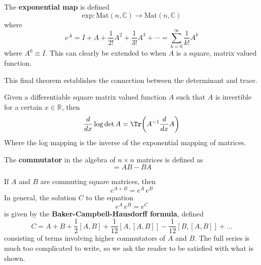  \begin{definition}
    The \textbf{exponential map} is defined
    \begin{equation}
      \text{exp}: \text{Mat}(n, \mathbb{C}) \longrightarrow \text{Mat}(n, \mathbb{C})
    \end{equation}
    where 
    \begin{equation}
      e^A = I + A + \frac{1}{2!} A^2 + \frac{1}{3!} A^3 + \cdots = \sum_{k=0}^\infty \frac{1}{k!} A^k
    \end{equation}
    where $A^0 \equiv I$. This can clearly be extended to when $A$ is a square, matrix valued function. 
  \end{definition}

  This final theorem establishes the connection between the determinant and trace. 

  \begin{theorem}
    Given a differentiable square matrix valued function $A$ such that $A$ is invertible for a certain $x \in \mathbb{R}$, then 
    \begin{equation}
      \frac{d}{d x} \log{\det{A}} = \Tr \bigg( A^{-1} \frac{d}{d x} A \bigg)
    \end{equation}
    Where the log mapping is the inverse of the exponential mapping of matrices. 
  \end{theorem}

  \begin{definition}
    The \textbf{commutator} in the algebra of $n \times n$ matrices is defined as 
    \begin{equation}
      [A, B] = A B - B A
    \end{equation}
  \end{definition}

  \begin{theorem}
    If $A$ and $B$ are commuting square matrices, then 
    \begin{equation}
      e^{A + B} = e^A \, e^B
    \end{equation}
    In general, the solution $C$ to the equation
    \begin{equation}
      e^{A} \, e^B = e^C
    \end{equation}
    is given by the \textbf{Baker-Campbell-Hausdorff formula}, defined
    \begin{equation}
      C = A + B + \frac{1}{2}[A,B] + \frac{1}{12} [A,[A,B]] - \frac{1}{12} [B,[A,B]] + \ldots
    \end{equation}
    consisting of terms involving higher commutators of $A$ and $B$. The full series is much too complicated to write, so we ask the reader to be satisfied with what is shown. 
  \end{theorem}

